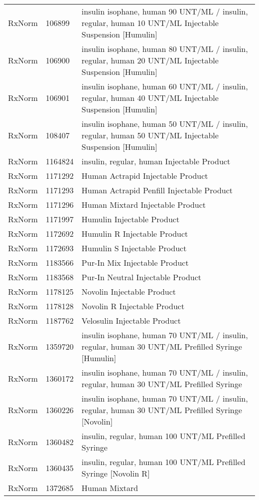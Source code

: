 \begin{longtable}{p{}p{}p{}}
  RxNorm & 106899 & insulin isophane, human 90 UNT/ML / insulin, regular, human 10 UNT/ML Injectable Suspension [Humulin] \\ 
  RxNorm & 106900 & insulin isophane, human 80 UNT/ML / insulin, regular, human 20 UNT/ML Injectable Suspension [Humulin] \\ 
  RxNorm & 106901 & insulin isophane, human 60 UNT/ML / insulin, regular, human 40 UNT/ML Injectable Suspension [Humulin] \\ 
  RxNorm & 108407 & insulin isophane, human 50 UNT/ML / insulin, regular, human 50 UNT/ML Injectable Suspension [Humulin] \\ 
  RxNorm & 1164824 & insulin, regular, human Injectable Product \\ 
  RxNorm & 1171292 & Human Actrapid Injectable Product \\ 
  RxNorm & 1171293 & Human Actrapid Penfill Injectable Product \\ 
  RxNorm & 1171296 & Human Mixtard Injectable Product \\ 
  RxNorm & 1171997 & Humulin Injectable Product \\ 
  RxNorm & 1172692 & Humulin R Injectable Product \\ 
  RxNorm & 1172693 & Humulin S Injectable Product \\ 
  RxNorm & 1183566 & Pur-In Mix Injectable Product \\ 
  RxNorm & 1183568 & Pur-In Neutral Injectable Product \\ 
  RxNorm & 1178125 & Novolin Injectable Product \\ 
  RxNorm & 1178128 & Novolin R Injectable Product \\ 
  RxNorm & 1187762 & Velosulin Injectable Product \\ 
  RxNorm & 1359720 & insulin isophane, human 70 UNT/ML / insulin, regular, human 30 UNT/ML Prefilled Syringe [Humulin] \\ 
  RxNorm & 1360172 & insulin isophane, human 70 UNT/ML / insulin, regular, human 30 UNT/ML Prefilled Syringe \\ 
  RxNorm & 1360226 & insulin isophane, human 70 UNT/ML / insulin, regular, human 30 UNT/ML Prefilled Syringe [Novolin] \\ 
  RxNorm & 1360482 & insulin, regular, human 100 UNT/ML Prefilled Syringe \\ 
  RxNorm & 1360435 & insulin, regular, human 100 UNT/ML Prefilled Syringe [Novolin R] \\ 
  RxNorm & 1372685 & Human Mixtard \\ 

\end{longtable}
